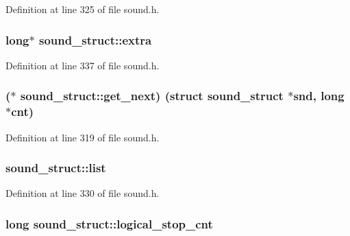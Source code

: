 Definition at line 325 of file sound.\+h.

\subsubsection[{\texorpdfstring{extra}{extra}}]{\setlength{\rightskip}{0pt plus 5cm}long$\ast$ sound\+\_\+struct\+::extra}\hypertarget{structsound__struct_a932aa99e359ac71885ffa3426b2353cf}{}\label{structsound__struct_a932aa99e359ac71885ffa3426b2353cf}


Definition at line 337 of file sound.\+h.

\subsubsection[{\texorpdfstring{get\+\_\+next}{get_next}}]{($\ast$ sound\+\_\+struct\+::get\+\_\+next) (struct {\bf sound\+\_\+struct} $\ast$snd, long $\ast$cnt)}\hypertarget{structsound__struct_ab03f6655f85673276f9a8bdc4affd358}{}\label{structsound__struct_ab03f6655f85673276f9a8bdc4affd358}


Definition at line 319 of file sound.\+h.

\subsubsection[{\texorpdfstring{list}{list}}]{ sound\+\_\+struct\+::list}\hypertarget{structsound__struct_abe0c2ecf4e89d7d8e679adb01442fd60}{}\label{structsound__struct_abe0c2ecf4e89d7d8e679adb01442fd60}


Definition at line 330 of file sound.\+h.

\subsubsection[{\texorpdfstring{logical\+\_\+stop\+\_\+cnt}{logical_stop_cnt}}]{\setlength{\rightskip}{0pt plus 5cm}long sound\+\_\+struct\+::logical\+\_\+stop\+\_\+cnt}\hypertarget{structsound__struct_a51e65ef2c1784b5bc543a84ec90d5022}{}\label{structsound__struct_a51e65ef2c1784b5bc543a84ec90d5022}


